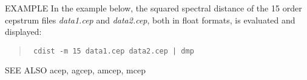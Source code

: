 \begin{options}
\end{options}

\begin{qsection}{EXAMPLE}
In the example below, the squared spectral distance of the 15 order
cepstrum files {\em data1.cep} and {\em data2.cep},
both in float formats, is evaluated and displayed:
\begin{quote}
\verb! cdist -m 15 data1.cep data2.cep | dmp !
\end{quote}
\end{qsection}

\begin{qsection}{SEE ALSO}
acep, agcep, amcep, mcep
\end{qsection}
